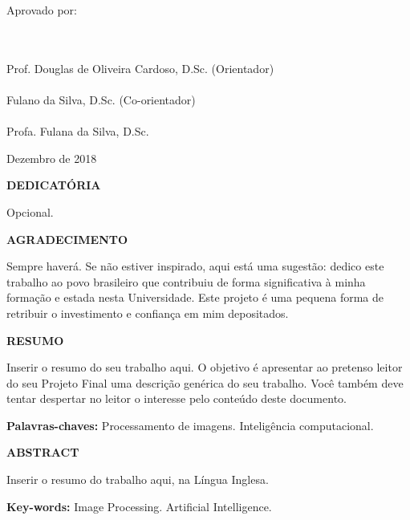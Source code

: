 {\begin{minipage}{0.9\textwidth}
	\begin{flushleft}
	Aprovado por:
	\end{flushleft}
\end{minipage}\\[1cm]

\center
\HRule \\
Prof. Douglas de Oliveira Cardoso, D.Sc. (Orientador) \\[0.4cm]
\HRule \\
Fulano da Silva, D.Sc. (Co-orientador)\\[0.4cm]
\HRule \\
Profa. Fulana da Silva, D.Sc.  \\[1.5cm]


\begin{center}
{Dezembro de 2018}
\end{center}


}



\newpage


\begin{center}
\textbf{\large DEDICATÓRIA}
\end{center}
      \vspace{0.5cm}

Opcional.
\newpage



\begin{center}
\textbf{\large  AGRADECIMENTO}
\end{center}
      \vspace{0.5cm}

Sempre haverá. Se não estiver inspirado, aqui está uma sugestão: dedico este trabalho ao povo brasileiro que contribuiu de forma significativa à minha formação e estada nesta Universidade. Este projeto é uma pequena forma de retribuir o investimento e confiança em mim depositados.
\newpage


\begin{center}
\textbf{\large RESUMO}
\end{center}
      \vspace{0.5cm}

Inserir o resumo do seu trabalho aqui. O objetivo é apresentar ao pretenso leitor do seu Projeto Final uma descrição genérica do seu trabalho. Você também deve tentar despertar no leitor o interesse pelo conteúdo deste documento.
\begin{flushleft}
{\bf Palavras-chaves:} Processamento de imagens. Inteligência computacional.
\end{flushleft}

\newpage

\begin{center}
\textbf{\large ABSTRACT}
\end{center}
\vspace{0.5cm}

Inserir o resumo do trabalho aqui, na Língua Inglesa.


\begin{flushleft}
{\bf Key-words:} Image Processing. Artificial Intelligence.
\end{flushleft}
